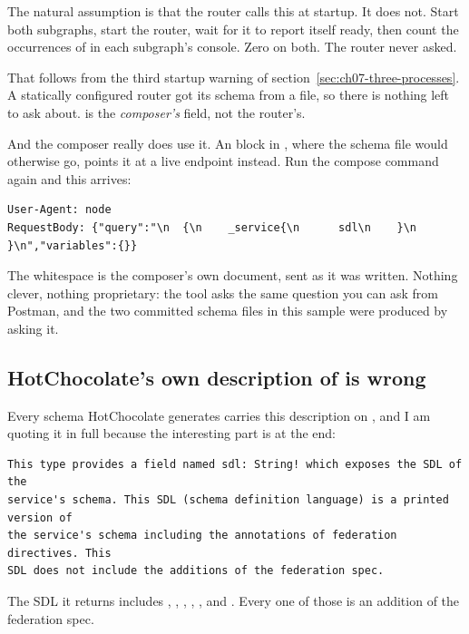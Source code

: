The natural assumption is that the router calls this at startup. It does not.
Start both subgraphs, start the router, wait for it to report itself ready, then
count the occurrences of  in each subgraph's console. Zero on
both. The router never asked.

That follows from the third startup warning of
section~\ref{sec:ch07-three-processes}. A statically configured router got its
schema from a file, so there is nothing left to ask about.  is
the \emph{composer's} field, not the router's.

%
And the composer really does use it. An  block in
, where the schema file would otherwise go, points it at a live
endpoint instead. Run the compose command again and this arrives:

\begin{verbatim}
User-Agent: node
RequestBody: {"query":"\n  {\n    _service{\n      sdl\n    }\n  }\n","variables":{}}
\end{verbatim}

The whitespace is the composer's own document, sent as it was written. Nothing
clever, nothing proprietary: the tool asks the same question you can ask from
Postman, and the two committed schema files in this sample were produced by
asking it.

\subsection*{HotChocolate's own description of  is wrong}

%
Every schema HotChocolate generates carries this description on ,
and I am quoting it in full because the interesting part is at the end:

\begin{verbatim}
This type provides a field named sdl: String! which exposes the SDL of the
service's schema. This SDL (schema definition language) is a printed version of
the service's schema including the annotations of federation directives. This
SDL does not include the additions of the federation spec.
\end{verbatim}

The SDL it returns includes , , ,
, ,  and . Every one of
those is an addition of the federation spec.

